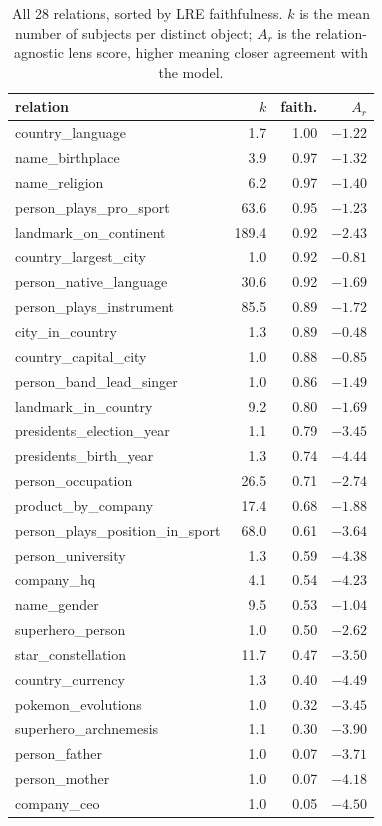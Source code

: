 \begin{table}[t]
\centering
\caption{All 28 relations, sorted by LRE faithfulness. $k$ is the mean number of subjects per distinct object; $A_r$ is the relation-agnostic lens score, higher meaning closer agreement with the model.}
\label{tab:relations}
\begin{tabular}{@{}lrrr@{}}
\toprule
relation & $k$ & faith. & $A_r$ \\
\midrule
country\_language & 1.7 & 1.00 & $-1.22$ \\
name\_birthplace & 3.9 & 0.97 & $-1.32$ \\
name\_religion & 6.2 & 0.97 & $-1.40$ \\
person\_plays\_pro\_sport & 63.6 & 0.95 & $-1.23$ \\
landmark\_on\_continent & 189.4 & 0.92 & $-2.43$ \\
country\_largest\_city & 1.0 & 0.92 & $-0.81$ \\
person\_native\_language & 30.6 & 0.92 & $-1.69$ \\
person\_plays\_instrument & 85.5 & 0.89 & $-1.72$ \\
city\_in\_country & 1.3 & 0.89 & $-0.48$ \\
country\_capital\_city & 1.0 & 0.88 & $-0.85$ \\
person\_band\_lead\_singer & 1.0 & 0.86 & $-1.49$ \\
landmark\_in\_country & 9.2 & 0.80 & $-1.69$ \\
presidents\_election\_year & 1.1 & 0.79 & $-3.45$ \\
presidents\_birth\_year & 1.3 & 0.74 & $-4.44$ \\
person\_occupation & 26.5 & 0.71 & $-2.74$ \\
product\_by\_company & 17.4 & 0.68 & $-1.88$ \\
person\_plays\_position\_in\_sport & 68.0 & 0.61 & $-3.64$ \\
person\_university & 1.3 & 0.59 & $-4.38$ \\
company\_hq & 4.1 & 0.54 & $-4.23$ \\
name\_gender & 9.5 & 0.53 & $-1.04$ \\
superhero\_person & 1.0 & 0.50 & $-2.62$ \\
star\_constellation & 11.7 & 0.47 & $-3.50$ \\
country\_currency & 1.3 & 0.40 & $-4.49$ \\
pokemon\_evolutions & 1.0 & 0.32 & $-3.45$ \\
superhero\_archnemesis & 1.1 & 0.30 & $-3.90$ \\
person\_father & 1.0 & 0.07 & $-3.71$ \\
person\_mother & 1.0 & 0.07 & $-4.18$ \\
company\_ceo & 1.0 & 0.05 & $-4.50$ \\
\bottomrule
\end{tabular}
\end{table}
